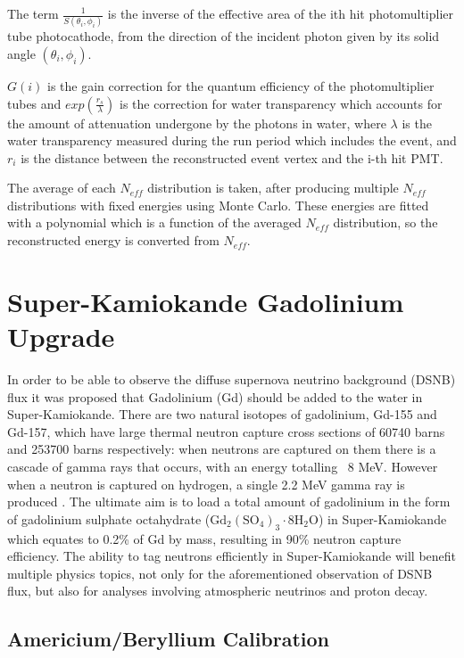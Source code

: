The term $\frac{1}{S(\theta_{i}, \phi_{i})}$ is the inverse of the effective area of the ith hit photomultiplier tube photocathode, from the direction of the incident photon given by its solid angle $(\theta_{i}, \phi_{i})$.

$G(i)$ is the gain correction for the quantum efficiency of the photomultiplier tubes and $exp(\frac{r_{s}}{\lambda})$ is the correction for water transparency which accounts for the amount of attenuation undergone by the photons in water, where $\lambda$ is the water transparency measured during the run period which includes the event, and $r_{i}$ is the distance between the reconstructed event vertex and the i-th hit PMT.

The average of each $N_{eff}$ distribution is taken, after producing multiple $N_{eff}$ distributions with fixed energies using Monte Carlo. These energies are fitted with a polynomial which is a function of the averaged $N_{eff}$ distribution, so the reconstructed energy is converted from $N_{eff}$.

\section{Super-Kamiokande Gadolinium Upgrade}

In order to be able to observe the diffuse supernova neutrino background (DSNB) flux it was proposed that Gadolinium (Gd) should be added to the water in Super-Kamiokande. There are two natural isotopes of gadolinium, Gd-155 and Gd-157, which have large thermal neutron capture cross sections of 60740 barns and 253700 barns respectively: when neutrons are captured on them there is a cascade of gamma rays that occurs, with an energy totalling ~8 MeV. However when a neutron is captured on hydrogen, a single 2.2 MeV gamma ray is produced \cite{meo_measurement_nodate}.  The ultimate aim is to load a total amount of gadolinium in the form of gadolinium sulphate octahydrate ($
\mathrm{Gd}_{2}\left(\mathrm{SO}_{4}\right)_{3} \cdot 8 \mathrm{H}_{2} \mathrm{O}$) in Super-Kamiokande which equates to 0.2\% of Gd by mass, resulting in 90\% neutron capture efficiency. The ability to tag neutrons efficiently in Super-Kamiokande will benefit multiple physics topics, not only for the aforementioned observation of DSNB flux, but also for analyses involving atmospheric neutrinos and proton decay. 

\subsection{Americium/Beryllium Calibration}

